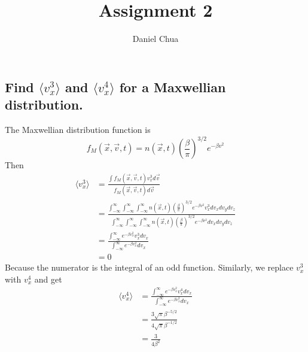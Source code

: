 \documentclass[answers]{exam}
\title{Assignment 2}
\author{Daniel Chua}
\begin{document}
\maketitle

\begin{questions}


\begin{parts}

    \part{Find $\langle v_x^3\rangle$ and $\langle v_x^4\rangle$ for a Maxwellian distribution.}

\begin{solution}
    The Maxwellian distribution function is
    \begin{equation}
        f_M(\vec x,\vec v, t) = n(\vec x,t) \left(\frac{\beta}{\pi}\right)^{3/2} e^{-\beta v^2}
    \end{equation}
    Then
    \begin{align*}
        \langle v_x^3 \rangle &= \frac{\int f_M(\vec x, \vec v, t) v_x^3 d\vec v}{f_M(\vec x, \vec v, t)d\vec v} \\
                              &= \frac{\int_{-\infty}^\infty \int_{-\infty}^\infty \int_{-\infty}^\infty n(\vec x,t) \left(\frac{\beta}{\pi}\right)^{3/2} e^{-\beta v^2} v_x^3 dv_xdv_ydv_z}{\int_{-\infty}^\infty \int_{-\infty}^\infty \int_{-\infty}^\infty n(\vec x,t) \left(\frac{\beta}{\pi}\right)^{3/2} e^{-\beta v^2} dv_xdv_ydv_z} \\
                              &= \frac{\int_{-\infty}^\infty e^{-\beta v_x^2} v_x^3 dv_x}{\int_{-\infty}^\infty e^{-\beta v_x^2} dv_x} \\
                              &= 0
    \end{align*}
    Because the numerator is the integral of an odd function. Similarly, we replace $v_x^3$ with $v_x^4$ and get
    \begin{align*}
        \langle v_x^4 \rangle &= \frac{\int_{-\infty}^\infty e^{-\beta v_x^2} v_x^4 dv_x}{\int_{-\infty}^\infty e^{-\beta v_x^2} dv_x} \\
                              &= \frac{3\sqrt{\pi}\beta^{-5/2}}{4\sqrt{\pi}\beta^{-1/2}} \\
                              &= \frac{3}{4\beta^2}
    \end{align*}
\end{solution}


\end{parts}
\end{questions}
\end{document}
